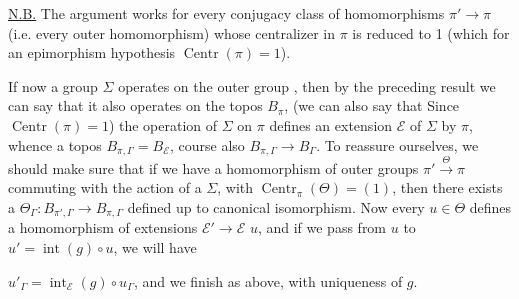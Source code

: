 \uline{N.B.} The argument works for every conjugacy
class of homomorphisms  \(\pi'\longrightarrow\pi\) (i.e. every outer
homomorphism) whose centralizer in \(\pi\) is
reduced to 1 (which for an epimorphism
 hypothesis \(\operatorname{Centr}(\pi)=1\)).

If now a group \(\Sigma\) operates
on the outer group \inserted{\(\pi\)}, then by the
preceding result we can say that it
also operates on the topos \(B_\pi\),  (we can
also say that  Since
\(\operatorname{Centr}(\pi)=1\)) the operation of \deleted{\(\unsure{\pi}\)}\(\Sigma\) on \(\pi\)
defines an extension \(\mathcal E\) of \(\Sigma\) by \(\pi\),
whence a topos \(B_{\pi,\Gamma}=B_{\mathcal E}\),   
course also \(B_{\pi,\Gamma}\longrightarrow B_{\Gamma}\). To reassure
ourselves, we should make sure that
if we have a homomorphism of outer groups
\(\pi'\xrightarrow{\Theta}\pi\) commuting with the action of a
\(\Sigma\), with \(\operatorname{Centr}_\pi(\Theta)=(1)\), then there exists
a \(\Theta_{\Gamma}:B_{\pi',\Gamma}\longrightarrow B_{\pi,\Gamma}\) defined up to canonical
isomorphism. Now every \(u\in\Theta\) defines a
homomorphism of extensions 
\(\mathcal E'\longrightarrow\mathcal E\) 
\(u\), and if we pass from \(u\) to \(u'=\operatorname{int}(g)\circ u\), we will have

\(u'_{\Gamma}=\operatorname{int}_{\mathcal E}(g)\circ u_{\Gamma}\), and we finish as
above, with uniqueness of \(g\).


